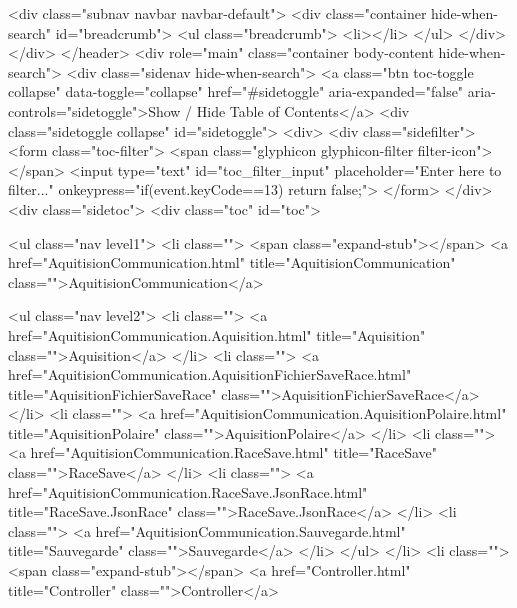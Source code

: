         <div class="subnav navbar navbar-default">
          <div class="container hide-when-search" id="breadcrumb">
            <ul class="breadcrumb">
              <li></li>
            </ul>
          </div>
        </div>
      </header>
      <div role="main" class="container body-content hide-when-search">
        <div class="sidenav hide-when-search">
          <a class="btn toc-toggle collapse" data-toggle="collapse" href="#sidetoggle" aria-expanded="false" aria-controls="sidetoggle">Show / Hide Table of Contents</a>
          <div class="sidetoggle collapse" id="sidetoggle">
            <div>
              <div class="sidefilter">
                <form class="toc-filter">
                  <span class="glyphicon glyphicon-filter filter-icon"></span>
                  <input type="text" id="toc_filter_input" placeholder="Enter here to filter..." onkeypress="if(event.keyCode==13) {return false;}">
                </form>
              </div>
              <div class="sidetoc">
                <div class="toc" id="toc">
                  
                  <ul class="nav level1">
                    <li class="">
                      <span class="expand-stub"></span>
                      <a href="AquitisionCommunication.html" title="AquitisionCommunication" class="">AquitisionCommunication</a>
                        
                        <ul class="nav level2">
                          <li class="">
                            <a href="AquitisionCommunication.Aquisition.html" title="Aquisition" class="">Aquisition</a>
                          </li>
                          <li class="">
                            <a href="AquitisionCommunication.AquisitionFichierSaveRace.html" title="AquisitionFichierSaveRace" class="">AquisitionFichierSaveRace</a>
                          </li>
                          <li class="">
                            <a href="AquitisionCommunication.AquisitionPolaire.html" title="AquisitionPolaire" class="">AquisitionPolaire</a>
                          </li>
                          <li class="">
                            <a href="AquitisionCommunication.RaceSave.html" title="RaceSave" class="">RaceSave</a>
                          </li>
                          <li class="">
                            <a href="AquitisionCommunication.RaceSave.JsonRace.html" title="RaceSave.JsonRace" class="">RaceSave.JsonRace</a>
                          </li>
                          <li class="">
                            <a href="AquitisionCommunication.Sauvegarde.html" title="Sauvegarde" class="">Sauvegarde</a>
                          </li>
                        </ul>  </li>
                    <li class="">
                      <span class="expand-stub"></span>
                      <a href="Controller.html" title="Controller" class="">Controller</a>
                        
